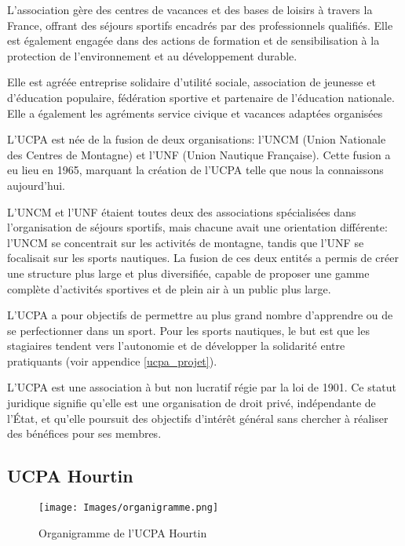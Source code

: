 \documentclass[11pt,a4paper]{report}
\begin{document}
L'association gère des centres de vacances et des bases de loisirs à travers la
France, offrant des séjours sportifs encadrés par des professionnels qualifiés.
Elle est également engagée dans des actions de formation et de sensibilisation 
à la protection de l'environnement et au développement durable.

Elle est agréée entreprise solidaire d’utilité sociale, association de
jeunesse et d’éducation populaire, fédération sportive et partenaire de 
l’éducation nationale. Elle a également les agréments service civique et
vacances adaptées organisées

L'UCPA est  née de la fusion de deux organisations: l'UNCM 
(Union Nationale des Centres de Montagne) et l'UNF 
(Union Nautique Française). Cette fusion a eu lieu en 1965, 
marquant la création de l'UCPA telle que nous la connaissons
aujourd'hui.

L'UNCM et l'UNF étaient toutes deux des associations spécialisées
dans l'organisation de séjours sportifs, mais chacune avait une
orientation différente: l'UNCM se concentrait sur les activités 
de montagne, tandis que l'UNF se focalisait sur les sports nautiques. 
La fusion de ces deux entités a permis de créer une structure plus 
large et plus diversifiée, capable de proposer une gamme complète 
d'activités sportives et de plein air à un public plus large.

L'UCPA a pour objectifs de permettre au plus grand nombre
d'apprendre ou de se perfectionner dans un sport.
Pour les sports nautiques, le but est que les stagiaires
tendent vers l'autonomie  et de développer la solidarité entre
pratiquants (voir appendice \ref{ucpa_projet}).

L'UCPA est 
une association à but non lucratif régie par la loi de 1901. 
Ce statut juridique signifie qu'elle est une organisation de
droit privé, indépendante de l'État, et qu'elle poursuit des
objectifs d'intérêt général sans chercher à  réaliser des
bénéfices pour ses membres.

\subsection{UCPA Hourtin}
\begin{figure}[h]
\centering
\texttt{[image: Images/organigramme.png]} 
\caption{Organigramme de l'UCPA Hourtin\label{organi_hourtin}}
\end{figure}
\end{document}
